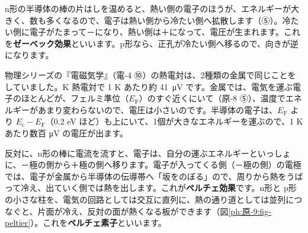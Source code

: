 \label{ph:原-9:sec13}
n形の半導体の棒の片はしを温めると、熱い側の電子のほうが、エネルギーが大きく、数も多くなるので、電子は熱い側から冷たい側へ拡散します（⑤）。冷たい側に電子がたまって－になり、熱い側は＋になって、電圧が生まれます。これを\textbf{ゼーベック効果}といいます。p形なら、正孔が冷たい側へ移るので、向きが逆になります。

物理シリーズの『電磁気学』（電-4 ⑩）の熱電対は、2種類の金属で同じことをしていました。K 熱電対で 1 K あたり約 \qty{41}{\micro V} です。金属では、電気を運ぶ電子のほとんどが、フェルミ準位（$E_{\mathrm F}$）のすぐ近くにいて（原-8 ⑤）、温度でエネルギーがあまり変わらないので、電圧は小さいのです。半導体の電子は、$E_{\mathrm F}$ より $E_{\mathrm c}-E_{\mathrm F}$（0.2 eV ほど）も上にいて、1個が大きなエネルギーを運ぶので、1 K あたり数百 \si{\micro V} の電圧が出ます。

反対に、n形の棒に電流を流すと、電子は、自分の運ぶエネルギーといっしょに、－極の側から＋極の側へ移ります。電子が入ってくる側（－極の側）の電極では、電子が金属から半導体の伝導帯へ「坂をのぼる」ので、周りから熱をうばって冷え、出ていく側では熱を出します。これが\textbf{ペルチェ効果}です。n形と p形の小さな柱を、電気の回路としては交互に直列に、熱の通り道としては並列につなぐと、片面が冷え、反対の面が熱くなる板ができます（図\ref{ph:原-9:fig-peltier}）。これを\textbf{ペルチェ素子}といいます。

